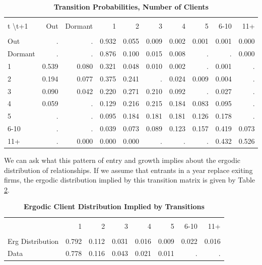 \documentclass[12pt,titlepage]{article}
\begin{document}
\begin{table}[bph]
    \centering
    \begin{tabular}{l|rrrrrrrrr} \hline \hline \\
        t \textbackslash t+1 & Out   & Dormant & 1     & 2     & 3     & 4     & 5     & 6-10  & 11+ \\ \hline \\
        Out                  & .     & .       & 0.932 & 0.055 & 0.009 & 0.002 & 0.001 & 0.001 & 0.000  \\
        Dormant              & .     & .       & 0.876 & 0.100 & 0.015 & 0.008 & .     & .     & 0.000  \\
        1                    & 0.539 & 0.080   & 0.321 & 0.048 & 0.010 & 0.002 & .     & 0.001 & .  \\
        2                    & 0.194 & 0.077   & 0.375 & 0.241 & .     & 0.024 & 0.009 & 0.004 & .  \\
        3                    & 0.090 & 0.042   & 0.220 & 0.271 & 0.210 & 0.092 & .     & 0.027 & .  \\
        4                    & 0.059 & .       & 0.129 & 0.216 & 0.215 & 0.184 & 0.083 & 0.095 & .  \\
        5                    & .     & .       & 0.095 & 0.184 & 0.181 & 0.181 & 0.126 & 0.178 & .  \\
        6-10                 & .     & .       & 0.039 & 0.073 & 0.089 & 0.123 & 0.157 & 0.419 & 0.073  \\
        11+                  & .     & 0.000   & 0.000 & 0.000 & .     & .     & .     & 0.432 & 0.526  \\ \hline
    \end{tabular}
    \caption{\textbf{Transition Probabilities, Number of Clients}}
    \label{tab:trans_probs}\centering
\end{table}

We can ask what this pattern of entry and growth implies about the ergodic
distribution of relationships. If we assume that entrants in a year replace
exiting firms, the ergodic distribution implied by this transition matrix is
given by Table \ref{tab:erg_cli_dist}.

\begin{table}[bph]
    \centering
    \begin{tabular}{l|rrrrrrr} \hline \hline \\
                 & 1     & 2         & 3         & 4         & 5         & 6-10      & 11+ \\ \hline \\
Erg Distribution & 0.792 &     0.112 &     0.031 &     0.016 &     0.009 &     0.022 &     0.016 \\
Data             & 0.778 & 0.116     & 0.043     & 0.021     & 0.011     & .         & . \\ \hline
    \end{tabular}
    \caption{\textbf{Ergodic Client Distribution Implied by Transitions}}
    \label{tab:erg_cli_dist}\centering{\small \ }
\end{table}
\end{document}
